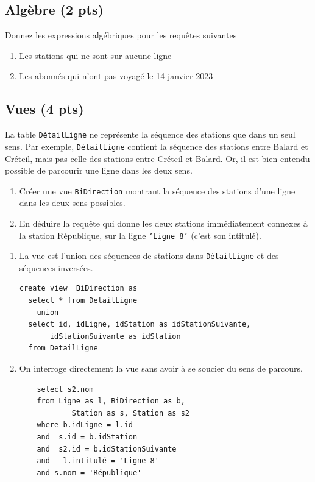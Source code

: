 \subsection*{Algèbre (2 pts)}

Donnez les expressions algébriques pour les requêtes suivantes

\begin{enumerate}
  \item Les stations qui ne sont sur aucune ligne 
  \item Les abonnés qui n'ont pas voyagé le 14 janvier 2023
\end{enumerate}


\subsection*{Vues (4 pts)}

La table \texttt{DétailLigne} ne représente la séquence
des stations que dans un seul sens. 
Par exemple, \texttt{DétailLigne} contient la
séquence des stations entre Balard et Créteil,
mais pas celle des stations entre Créteil et Balard.
Or, il est bien entendu
possible de parcourir une ligne dans les deux sens.

\begin{enumerate}
  \item Créer une vue \texttt{BiDirection} montrant 
      la séquence des stations d'une ligne dans les 
	  deux sens possibles. 
  \item En déduire la requête qui donne les
     deux stations immédiatement connexes à la station République,
	 sur la ligne \texttt{'Ligne 8'} (c'est son intitulé). 
	
\end{enumerate}

\begin{solution}
\begin{enumerate}
 \item La vue est l'union des séquences de stations
     dans \texttt{DétailLigne} et des séquences inversées.
\begin{verbatim}
create view  BiDirection as 
  select * from DetailLigne
    union
  select id, idLigne, idStation as idStationSuivante, 
       idStationSuivante as idStation
  from DetailLigne
\end{verbatim}     

 \item On interroge directement la vue sans avoir à se soucier
 du sens de parcours.
 

 \begin{verbatim}
    select s2.nom
    from Ligne as l, BiDirection as b, 
            Station as s, Station as s2
    where b.idLigne = l.id
    and  s.id = b.idStation
    and  s2.id = b.idStationSuivante
    and   l.intitulé = 'Ligne 8'
    and s.nom = 'République'
 \end{verbatim}

  \end{enumerate}
\end{solution}


